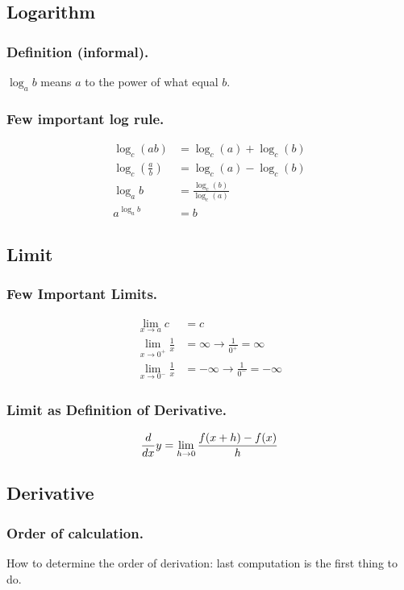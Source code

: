 \documentclass[../main.tex]{subfiles}
\begin{document}
\subsection{Logarithm}
\subsubsection{Definition (informal).} $\log_a b$ means $a$ to the power of what equal $b$.

\subsubsection{Few important log rule.}
\begin{align*}
    \log_c (ab)&=\log_c (a)+\log_c (b)\\
    \log_c (\frac{a}{b})&=\log_c (a)-\log_c (b)\\
    \log_a b&=\frac{\log_c (b)}{\log_c (a)}\\
    a^{\log_a b}&=b
\end{align*}

\subsection{Limit}
\subsubsection{Few Important Limits.}
\begin{align*}
    \lim_{x\to a} c&=c\\
    \lim_{x\to 0^+} \frac{1}{x}&=\infty\rightarrow\frac{1}{0^+}=\infty\\
    \lim_{x\to 0^-} \frac{1}{x}&=-\infty\rightarrow\frac{1}{0^-}=-\infty
\end{align*}
\subsubsection{Limit as Definition of Derivative.}
\begin{align*}
    \frac{d}{dx} y=\lim_{h\to 0}\frac{f(x+h)-f(x)}{h}
\end{align*}

\subsection{Derivative}

\subsubsection{Order of calculation.} How to determine the order of derivation: last computation is the first thing to do.
\end{document}
